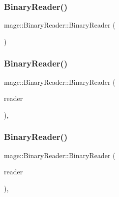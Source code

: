 \hypertarget{classmage_1_1_binary_reader_aab82579cef4f2f022273cf1adfcc8497}{}\label{classmage_1_1_binary_reader_aab82579cef4f2f022273cf1adfcc8497} 
\subsubsection{\texorpdfstring{Binary\+Reader()}{BinaryReader()}\hspace{0.1cm}{\footnotesize\ttfamily [1/3]}}
{\footnotesize\ttfamily mage\+::\+Binary\+Reader\+::\+Binary\+Reader (\begin{DoxyParamCaption}{ }\end{DoxyParamCaption})\hspace{0.3cm}{\ttfamily [protected]}}

\hypertarget{classmage_1_1_binary_reader_a8c1ff948f1d056439f3d8cc37d7f507c}{}\label{classmage_1_1_binary_reader_a8c1ff948f1d056439f3d8cc37d7f507c} 
\subsubsection{\texorpdfstring{Binary\+Reader()}{BinaryReader()}\hspace{0.1cm}{\footnotesize\ttfamily [2/3]}}
{\footnotesize\ttfamily mage\+::\+Binary\+Reader\+::\+Binary\+Reader (\begin{DoxyParamCaption}\item[{const \hyperlink{classmage_1_1_binary_reader}{Binary\+Reader} \&}]{reader }\end{DoxyParamCaption})\hspace{0.3cm}{\ttfamily [protected]}, {\ttfamily [delete]}}

\hypertarget{classmage_1_1_binary_reader_a5d9504fb2556cb346713bceacc3237dd}{}\label{classmage_1_1_binary_reader_a5d9504fb2556cb346713bceacc3237dd} 
\subsubsection{\texorpdfstring{Binary\+Reader()}{BinaryReader()}\hspace{0.1cm}{\footnotesize\ttfamily [3/3]}}
{\footnotesize\ttfamily mage\+::\+Binary\+Reader\+::\+Binary\+Reader (\begin{DoxyParamCaption}\item[{\hyperlink{classmage_1_1_binary_reader}{Binary\+Reader} \&\&}]{reader }\end{DoxyParamCaption})\hspace{0.3cm}{\ttfamily [protected]}, {\ttfamily [default]}}



